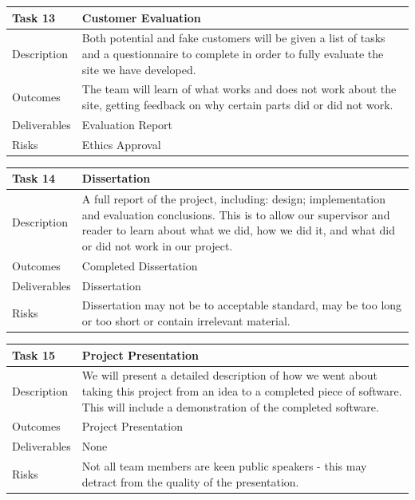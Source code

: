 \documentclass{l3proj}
\begin{document}
\begin{center}
    \begin{tabular}{ | l | p{12cm} |}
    \hline	
    Task 13 & Customer Evaluation \\ \hline
    Description & Both potential and fake customers will be given a list of tasks and a questionnaire to complete in order to fully evaluate the site we have developed. \\ \hline   
    Outcomes & The team will learn of what works and does not work about the site, getting feedback on why certain parts did or did not work. \\ \hline
    Deliverables & Evaluation Report \\ \hline
    Risks & Ethics Approval \\ 
    \hline
    \end{tabular}
\end{center}

\begin{center}
    \begin{tabular}{ | l | p{12cm} |}
    \hline	
    Task 14 & Dissertation \\ \hline
    Description & A full report of the project, including: design; implementation and evaluation conclusions. This is to allow our supervisor and reader to learn about what we did, how we did it, and what did or did not work in our project. \\ \hline   
    Outcomes & Completed Dissertation \\ \hline
    Deliverables & Dissertation \\ \hline
    Risks & Dissertation may not be to acceptable standard, may be too long or too short or contain irrelevant material. \\ 
    \hline
    \end{tabular}
\end{center}

\begin{center}
    \begin{tabular}{ | l | p{12cm} |}
    \hline	
    Task 15 & Project Presentation \\ \hline
    Description & We will present a detailed description of how we went about taking this project from an idea to a completed piece of software. This will include a demonstration of the completed software. \\ \hline   
    Outcomes & Project Presentation \\ \hline
    Deliverables & None \\ \hline
    Risks & Not all team members are keen public speakers - this may detract from the quality of the presentation. \\ 
    \hline
    \end{tabular}
\end{center}
\end{document}
